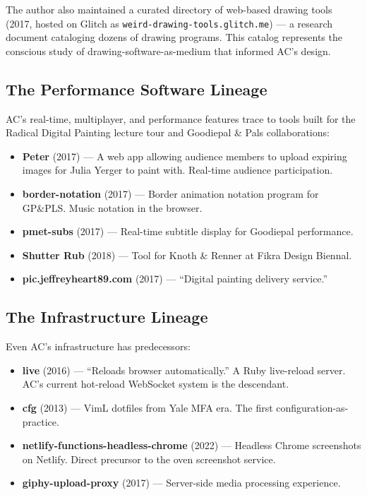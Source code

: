 \documentclass[10pt,letterpaper,twocolumn]{article}
\begin{document}
The author also maintained a curated directory of web-based drawing tools (2017, hosted on Glitch as \texttt{weird-drawing-tools.glitch.me}) --- a research document cataloging dozens of drawing programs. This catalog represents the conscious study of drawing-software-as-medium that informed AC's design.

\subsection{The Performance Software Lineage}

AC's real-time, multiplayer, and performance features trace to tools built for the Radical Digital Painting lecture tour and Goodiepal \& Pals collaborations:

\begin{itemize}
  \item \textbf{Peter} (2017) --- A web app allowing audience members to upload expiring images for Julia Yerger to paint with. Real-time audience participation.
  \item \textbf{border-notation} (2017) --- Border animation notation program for GP\&PLS. Music notation in the browser.
  \item \textbf{pmet-subs} (2017) --- Real-time subtitle display for Goodiepal performance.
  \item \textbf{Shutter Rub} (2018) --- Tool for Knoth \& Renner at Fikra Design Biennal.
  \item \textbf{pic.jeffreyheart89.com} (2017) --- ``Digital painting delivery service.''
\end{itemize}

\subsection{The Infrastructure Lineage}

Even AC's infrastructure has predecessors:

\begin{itemize}
  \item \textbf{live} (2016) --- ``Reloads browser automatically.'' A Ruby live-reload server. AC's current hot-reload WebSocket system is the descendant.
  \item \textbf{cfg} (2013) --- VimL dotfiles from Yale MFA era. The first configuration-as-practice.
  \item \textbf{netlify-functions-headless-chrome} (2022) --- Headless Chrome screenshots on Netlify. Direct precursor to the oven screenshot service.
  \item \textbf{giphy-upload-proxy} (2017) --- Server-side media processing experience.
\end{itemize}
\end{document}
